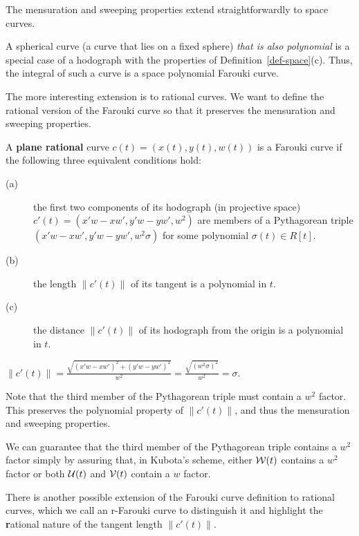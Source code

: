 The mensuration and sweeping properties extend straightforwardly to
space curves.

\begin{rmk}
A spherical curve (a curve that lies on a fixed sphere)
{\em that is also polynomial}
is a special case of a hodograph with the properties of 
Definition~\ref{def-space}(c).
Thus, the integral of such a curve is a space polynomial Farouki curve.
\end{rmk}

The more interesting extension is to rational curves.
We want to define the rational version of the Farouki curve so that it
preserves the mensuration and sweeping properties.

\begin{dfn}
A {\bf plane rational} curve $c(t) = (x(t),y(t),w(t))$
is a Farouki curve if the following three equivalent conditions hold:
\begin{description}
\item[(a)]
	the first two components of its hodograph (in projective space)\\
	$c'(t) = (x'w - xw', y'w - yw', w^2)$
	are members of a Pythagorean triple \\
	$(x'w - xw', y'w - yw', w^2 \sigma)$
	for some polynomial $\sigma(t) \in R[t]$.
\item[(b)]
	the length $\| c'(t) \|$ of its tangent is a polynomial in $t$.
\item[(c)]
	the distance $\| c'(t) \|$ of its hodograph from the origin
	is a polynomial in $t$.
\end{description}
\end{dfn}
$\| c'(t) \| = \frac{\sqrt{(x'w - xw')^2 + (y'w - yw')^2}}{w^2}
	     = \frac{\sqrt{(w^2 \sigma)^2}}{w^2} = \sigma$.
\QED

Note that the third member of the Pythagorean triple must contain
a $w^2$ factor.
This preserves the polynomial property of $\|c'(t)\|$,
and thus the mensuration and sweeping properties.

\begin{rmk}
We can guarantee that the third member of the Pythagorean triple 
contains a $w^2$ factor simply by assuring that, in Kubota's scheme,
either ${\cal W}(t)$ contains a $w^2$ factor or both ${\cal U}(t)$
and ${\cal V}(t)$ contain a $w$ factor.
\end{rmk}

There is another possible extension of the Farouki curve definition 
to rational curves, which we call an r-Farouki curve to distinguish
it and highlight the {\bf r}ational nature of the tangent length
$\| c'(t) \|$.

